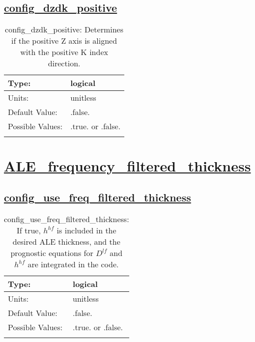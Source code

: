 \subsection[config\_dzdk\_positive]{\hyperref[sec:nm_tab_ALE_vertical_grid]{config\_dzdk\_positive}}
\label{subsec:nm_sec_config_dzdk_positive}
\begin{center}
\begin{longtable}{| p{2.0in} || p{4.0in} |}
    \hline
    Type: & logical \\
    \hline
    Units: & \si{unitless} \\
    \hline
    Default Value: & .false. \\
    \hline
    Possible Values: & .true. or .false. \\
    \hline
    \caption{config\_dzdk\_positive: Determines if the positive Z axis is aligned with the positive K index direction.}
\end{longtable}
\end{center}
\section[ALE\_frequency\_filtered\_thickness]{\hyperref[sec:nm_tab_ALE_frequency_filtered_thickness]{ALE\_frequency\_filtered\_thickness}}
\label{sec:nm_sec_ALE_frequency_filtered_thickness}
\subsection[config\_use\_freq\_filtered\_thickness]{\hyperref[sec:nm_tab_ALE_frequency_filtered_thickness]{config\_use\_freq\_filtered\_thickness}}
\label{subsec:nm_sec_config_use_freq_filtered_thickness}
\begin{center}
\begin{longtable}{| p{2.0in} || p{4.0in} |}
    \hline
    Type: & logical \\
    \hline
    Units: & \si{unitless} \\
    \hline
    Default Value: & .false. \\
    \hline
    Possible Values: & .true. or .false. \\
    \hline
    \caption{config\_use\_freq\_filtered\_thickness: If true, $h^{hf}$ is included in the desired ALE thickness, and the prognostic equations for $D^{lf}$ and $h^{hf}$ are integrated in the code.}
\end{longtable}
\end{center}
